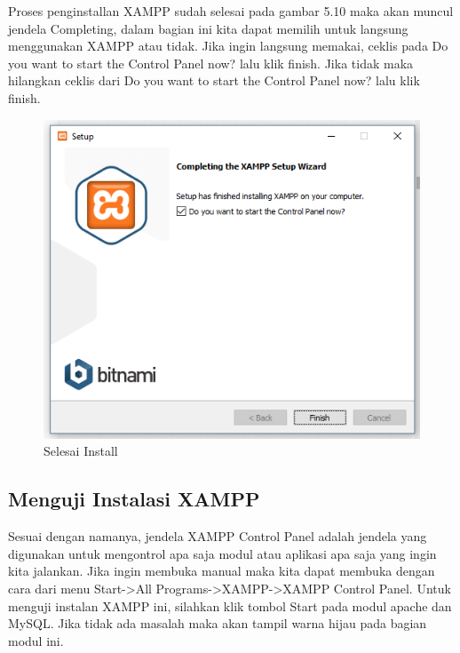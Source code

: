 Proses penginstallan XAMPP sudah selesai pada gambar 5.10 maka akan muncul jendela Completing, dalam bagian ini kita dapat memilih untuk langsung menggunakan XAMPP atau tidak. Jika ingin langsung memakai, ceklis pada Do you want to start the Control Panel now? lalu klik finish. Jika tidak maka hilangkan ceklis dari  Do you want to start the Control Panel now? lalu klik finish.

\begin{figure}[h]
\centering
\includegraphics[scale=0.5]{figures/selesaiinstall}
\caption{Selesai Install}
\end{figure}

\subsection{Menguji Instalasi XAMPP}
Sesuai dengan namanya, jendela XAMPP Control Panel adalah jendela yang digunakan untuk mengontrol apa saja modul atau aplikasi apa saja yang ingin kita jalankan. Jika ingin membuka manual maka kita dapat membuka dengan cara dari menu Start->All Programs->XAMPP->XAMPP Control Panel. Untuk menguji instalan XAMPP ini, silahkan klik tombol Start pada modul apache dan MySQL. Jika tidak ada masalah maka akan tampil warna hijau pada bagian modul ini.

